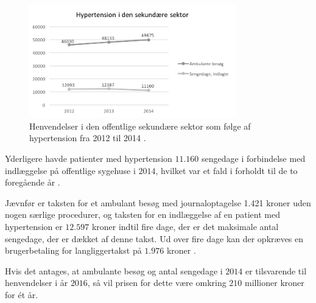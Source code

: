 \begin{figure}[H]
\centering
\includegraphics[width=0.8\textwidth]{figures/hyp_sekundaer}
\caption{Henvendelser i den offentlige sekundære sektor som følge af hypertension fra 2012 til 2014 \citep{sundhedsdatastyrelsen2016}.}
\label{fig:hyp_sekundaer}
\end{figure}

\noindent
Yderligere havde patienter med hypertension $11.160$ sengedage i forbindelse med indlæggelse på offentlige sygehuse i $2014$, hvilket var et fald i forholdt til de to foregående år \citep{sundhedsdatastyrelsen2016}. 

Jævnfør \citeauthor{takstvejledning2016} er taksten for et ambulant besøg  med journaloptagelse 1.421 kroner uden nogen særlige procedurer, og taksten for en indlæggelse af en patient med hypertension er $12.597$ kroner indtil fire dage, der er det maksimale antal sengedage, der er dækket af denne takst. Ud over fire dage kan der opkræves en brugerbetaling for langliggertakst på $1.976$ kroner \citep{takstvejledning2016}. 

Hvis det antages, at ambulante besøg og antal sengedage i $2014$ er tilsvarende til henvendelser i år $2016$, så vil prisen for dette være omkring $210$ millioner kroner for ét år. 